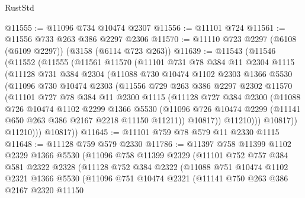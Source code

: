 \begin{lexlean}{RustStd}
\begin{coremodule}
@11555 := @11096 @734 @10474 @2307
@11556 := @11101 @724
@11561 := @11556 @733 @263 @386 @2297 @2306
@11570 := @11110 @723 @2297 (@6108 (@6109 @2297)) (@3158 (@6114 @723 @263))
@11639 := @11543
    (@11546
      (@11552
        (@11555
          (@11561
            @11570
            (@11101
              @731
              @78
              @384
              @11
              @2304
              @1115
              (@11128
                @731
                @384
                @2304
                (@11088
                  @730
                  @10474
                  @1102
                  @2303
                  @1366
                  @5530
                  (@11096
                    @730
                    @10474
                    @2303
                    (@11556
                      @729
                      @263
                      @386
                      @2297
                      @2302
                      @11570
                      (@11101
                        @727
                        @78
                        @384
                        @11
                        @2300
                        @1115
                        (@11128
                          @727
                          @384
                          @2300
                          (@11088
                            @726
                            @10474
                            @1102
                            @2299
                            @1366
                            @5530
                            (@11096
                              @726
                              @10474
                              @2299
                              (@11141 @650 @263 @386 @2167 @2218 @11150 @11211))
                            @10817))
                        @11210)))
                  @10817))
              @11210)))
        @10817))
@11645 := @11101 @759 @78 @579 @11 @2330 @1115
@11648 := @11128 @759 @579 @2330
@11786 := @11397
    @758
    @11399
    @1102
    @2329
    @1366
    @5530
    (@11096
      @758
      @11399
      @2329
      (@11101
        @752
        @757
        @384
        @581
        @2322
        @2328
        (@11128
          @752
          @384
          @2322
          (@11088
            @751
            @10474
            @1102
            @2321
            @1366
            @5530
            (@11096
              @751
              @10474
              @2321
              (@11141
                @750
                @263
                @386
                @2167
                @2320
                @11150

\end{coremodule}
\end{lexlean}
